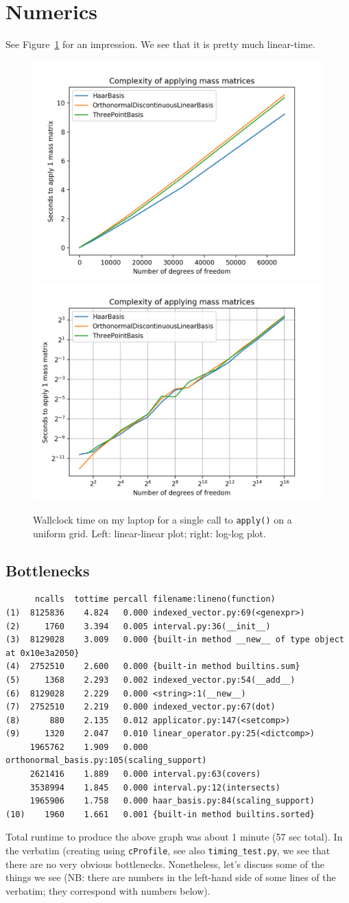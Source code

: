 \documentclass[11pt,a4paper]{amsart}
\theoremstyle{definition}
\begin{document}
\section{Numerics}
See Figure~\ref{fig:linear} for an impression. We see that it is pretty much linear-time.
\begin{figure}
  \includegraphics[width=0.5\linewidth]{../../Latex/img/time-scaling-31-jul.png}\hfill
  \includegraphics[width=0.5\linewidth]{../../Latex/img/time-scaling-31-jul-loglog.png}
  \caption{Wallclock time on my laptop for a single call to \texttt{apply()} on a uniform grid. Left: linear-linear plot; right: log-log plot.}
  \label{fig:linear}
\end{figure}
\subsection{Bottlenecks}
\begin{verbatim}
      ncalls  tottime percall filename:lineno(function)
(1)  8125836    4.824   0.000 indexed_vector.py:69(<genexpr>)
(2)     1760    3.394   0.005 interval.py:36(__init__)
(3)  8129028    3.009   0.000 {built-in method __new__ of type object at 0x10e3a2050}
(4)  2752510    2.600   0.000 {built-in method builtins.sum}
(5)     1368    2.293   0.002 indexed_vector.py:54(__add__)
(6)  8129028    2.229   0.000 <string>:1(__new__)
(7)  2752510    2.219   0.000 indexed_vector.py:67(dot)
(8)      880    2.135   0.012 applicator.py:147(<setcomp>)
(9)     1320    2.047   0.010 linear_operator.py:25(<dictcomp>)
     1965762    1.909   0.000 orthonormal_basis.py:105(scaling_support)
     2621416    1.889   0.000 interval.py:63(covers)
     3538994    1.845   0.000 interval.py:12(intersects)
     1965906    1.758   0.000 haar_basis.py:84(scaling_support)
(10)    1960    1.661   0.001 {built-in method builtins.sorted}
\end{verbatim}
Total runtime to produce the above graph was about 1 minute (57 sec total).
In the verbatim (creating using \texttt{cProfile}, see also \texttt{timing\_test.py},
we see that there are no very obvious bottlenecks. Nonetheless, let's discuss some
of the things we see (NB: there are numbers in the left-hand side of some lines of the verbatim; they correspond with numbers below).
\end{document}
